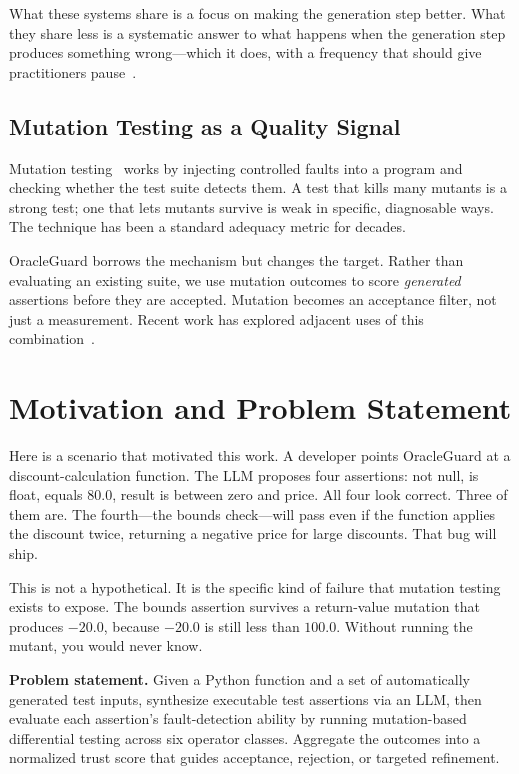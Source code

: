 \documentclass[conference]{IEEEtran}
\begin{document}
What these systems share is a focus on making the generation step better. What they share less is a systematic answer to what happens when the generation step produces something wrong—which it does, with a frequency that should give practitioners pause~\cite{bodicoat2025understanding}.

\subsection{Mutation Testing as a Quality Signal}

Mutation testing~\cite{jia2011mutation,papadakis2019mutation} works by injecting controlled faults into a program and checking whether the test suite detects them. A test that kills many mutants is a strong test; one that lets mutants survive is weak in specific, diagnosable ways. The technique has been a standard adequacy metric for decades.

OracleGuard borrows the mechanism but changes the target. Rather than evaluating an existing suite, we use mutation outcomes to score \emph{generated} assertions before they are accepted. Mutation becomes an acceptance filter, not just a measurement. Recent work has explored adjacent uses of this combination~\cite{straubinger2025mutation,alimadadi2026hybrid}.

\section{Motivation and Problem Statement}

Here is a scenario that motivated this work. A developer points OracleGuard at a discount-calculation function. The LLM proposes four assertions: not null, is float, equals 80.0, result is between zero and price. All four look correct. Three of them are. The fourth—the bounds check—will pass even if the function applies the discount twice, returning a negative price for large discounts. That bug will ship.

This is not a hypothetical. It is the specific kind of failure that mutation testing exists to expose. The bounds assertion survives a return-value mutation that produces $-20.0$, because $-20.0$ is still less than $100.0$. Without running the mutant, you would never know.

\textbf{Problem statement.} Given a Python function and a set of automatically generated test inputs, synthesize executable test assertions via an LLM, then evaluate each assertion's fault-detection ability by running mutation-based differential testing across six operator classes. Aggregate the outcomes into a normalized trust score that guides acceptance, rejection, or targeted refinement.
\end{document}
